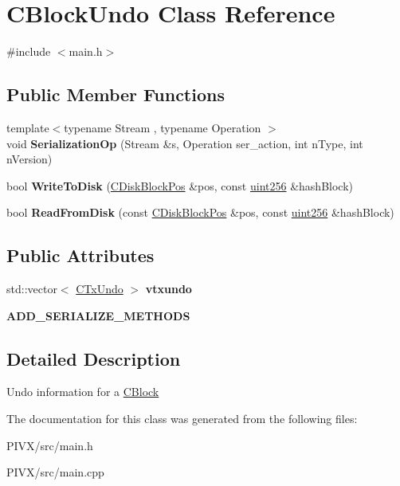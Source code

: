 \hypertarget{class_c_block_undo}{}\section{C\+Block\+Undo Class Reference}
\label{class_c_block_undo}


{\ttfamily \#include $<$main.\+h$>$}

\subsection*{Public Member Functions}
\begin{DoxyCompactItemize}
\item 
\mbox{\label{class_c_block_undo_ad4d50e2b34e291dbe2d15fbe3ae3670b}} 
{\footnotesize template$<$typename Stream , typename Operation $>$ }\\void {\bfseries Serialization\+Op} (Stream \&s, Operation ser\+\_\+action, int n\+Type, int n\+Version)
\item 
\mbox{\label{class_c_block_undo_a5411380452c33aeb6ccccbdf6ffda066}} 
bool {\bfseries Write\+To\+Disk} (\mbox{\hyperlink{struct_c_disk_block_pos}{C\+Disk\+Block\+Pos}} \&pos, const \mbox{\hyperlink{classuint256}{uint256}} \&hash\+Block)
\item 
\mbox{\label{class_c_block_undo_a9b3d67fdd3a2b88dbbd543bf530ee924}} 
bool {\bfseries Read\+From\+Disk} (const \mbox{\hyperlink{struct_c_disk_block_pos}{C\+Disk\+Block\+Pos}} \&pos, const \mbox{\hyperlink{classuint256}{uint256}} \&hash\+Block)
\end{DoxyCompactItemize}
\subsection*{Public Attributes}
\begin{DoxyCompactItemize}
\item 
\mbox{\label{class_c_block_undo_ad0baf7a4d3634b27b4affac2e7cf75c9}} 
std\+::vector$<$ \mbox{\hyperlink{class_c_tx_undo}{C\+Tx\+Undo}} $>$ {\bfseries vtxundo}
\item 
\mbox{\label{class_c_block_undo_a4fecc9723902f51e25b57e2e2d45334a}} 
{\bfseries A\+D\+D\+\_\+\+S\+E\+R\+I\+A\+L\+I\+Z\+E\+\_\+\+M\+E\+T\+H\+O\+DS}
\end{DoxyCompactItemize}


\subsection{Detailed Description}
Undo information for a \mbox{\hyperlink{class_c_block}{C\+Block}} 

The documentation for this class was generated from the following files\+:\begin{DoxyCompactItemize}
\item 
P\+I\+V\+X/src/main.\+h\item 
P\+I\+V\+X/src/main.\+cpp\end{DoxyCompactItemize}
